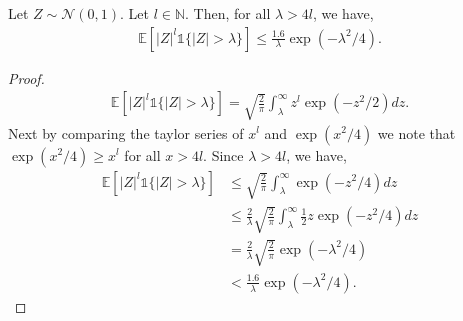 \documentclass[final,12pt]{colt2018} %
\newcommand{\N}{\mathbb{N}}
\newcommand{\E}{\mathbb{E}}
\newcommand{\gauss}[2]{\mathcal{N}\left( #1,#2 \right)}
\newcommand{\indicator}[1]{\mathds{1}\{#1\}}
\begin{document}
\begin{lemma} Let $Z \sim \gauss{0}{1}$. Let $l \in \N$. Then, for all $\lambda > 4l$, we have,
\begin{align*}
    \E[|Z|^l \indicator{|Z| > \lambda}]\leq \frac{1.6}{\lambda} \exp(-\lambda^2/4).
\end{align*}
\label{lemma: gauss_truncation}
\end{lemma}
\begin{proof}
\begin{align*}
    \E[|Z|^l \indicator{|Z| > \lambda}] = \sqrt{\frac{2}{\pi}} \int_\lambda^\infty  z^l \exp(-z^2/2) dz.
\end{align*}
Next by comparing the taylor series of $x^{l}$ and $\exp(x^2/4)$ we note that $\exp(x^2/4) \geq x^l$ for all $x > 4l$. Since $\lambda > 4l$, we have,
\begin{align*}
    \E[|Z|^l \indicator{|Z| > \lambda}] & \leq \sqrt{\frac{2}{\pi}}\int_\lambda^\infty \exp(-z^2/4) dz \\
    & \leq \frac{2}{\lambda} \sqrt{\frac{2}{\pi}}\int_\lambda^\infty \frac{1}{2} z \exp(-z^2/4) dz \\
    & = \frac{2}{\lambda}\sqrt{\frac{2}{\pi}} \exp(-\lambda^2/4) \\
    & < \frac{1.6}{\lambda} \exp(-\lambda^2/4).
\end{align*}
\end{proof}
\end{document}
